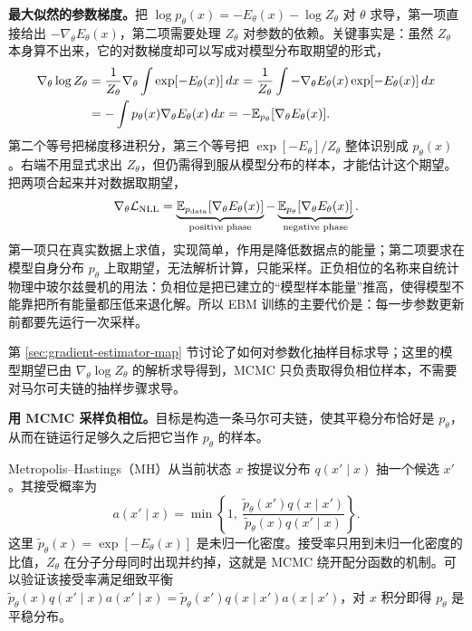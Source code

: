 \textbf{最大似然的参数梯度。}把 \(\log p_\theta(x)=-E_\theta(x)-\log Z_\theta\) 对 \(\theta\) 求导，第一项直接给出 \(-\nabla_\theta E_\theta(x)\)，第二项需要处理 \(Z_\theta\) 对参数的依赖。关键事实是：虽然 \(Z_\theta\) 本身算不出来，它的对数梯度却可以写成对模型分布取期望的形式，
\begin{align}
 \nabla_\theta\log Z_\theta
 &=\frac{1}{Z_\theta}\nabla_\theta\int\exp[-E_\theta(x)]\,dx
 =\frac{1}{Z_\theta}\int-\nabla_\theta E_\theta(x)\exp[-E_\theta(x)]\,dx\notag\\
 &=-\int p_\theta(x)\nabla_\theta E_\theta(x)\,dx
 =-\mathbb{E}_{p_\theta}[\nabla_\theta E_\theta(x)].
\end{align}
第二个等号把梯度移进积分，第三个等号把 \(\exp[-E_\theta]/Z_\theta\) 整体识别成 \(p_\theta(x)\)。右端不用显式求出 \(Z_\theta\)，但仍需得到服从模型分布的样本，才能估计这个期望。把两项合起来并对数据取期望，
\begin{equation}
 \nabla_\theta\mathcal L_{\mathrm{NLL}}
 =\underbrace{\mathbb{E}_{p_{\mathrm{data}}}[\nabla_\theta E_\theta(x)]}_{\text{positive phase}}
 -\underbrace{\mathbb{E}_{p_\theta}[\nabla_\theta E_\theta(x)]}_{\text{negative phase}}.
\end{equation}
第一项只在真实数据上求值，实现简单，作用是降低数据点的能量；第二项要求在模型自身分布 \(p_\theta\) 上取期望，无法解析计算，只能采样。正负相位的名称来自统计物理中玻尔兹曼机的用法：负相位是把已建立的“模型样本能量”推高，使得模型不能靠把所有能量都压低来退化解。所以 EBM 训练的主要代价是：每一步参数更新前都要先运行一次采样。

第 \ref{sec:gradient-estimator-map} 节讨论了如何对参数化抽样目标求导；这里的模型期望已由 \(\nabla_\theta\log Z_\theta\) 的解析求导得到，MCMC 只负责取得负相位样本，不需要对马尔可夫链的抽样步骤求导。

\textbf{用 MCMC 采样负相位。}目标是构造一条马尔可夫链，使其平稳分布恰好是 \(p_\theta\)，从而在链运行足够久之后把它当作 \(p_\theta\) 的样本。

Metropolis--Hastings（MH）从当前状态 \(x\) 按提议分布 \(q(x'\mid x)\) 抽一个候选 \(x'\)。其接受概率为
\begin{equation}
 a(x'\mid x)=\min\left\{1,\ \frac{\tilde p_\theta(x')q(x\mid x')}{\tilde p_\theta(x)q(x'\mid x)}\right\}.
\end{equation}
这里 \(\tilde p_\theta(x)=\exp[-E_\theta(x)]\) 是未归一化密度。接受率只用到未归一化密度的比值，\(Z_\theta\) 在分子分母同时出现并约掉，这就是 MCMC 绕开配分函数的机制。可以验证该接受率满足细致平衡 \(\tilde p_\theta(x)q(x'\mid x)a(x'\mid x)=\tilde p_\theta(x')q(x\mid x')a(x\mid x')\)，对 \(x\) 积分即得 \(p_\theta\) 是平稳分布。

